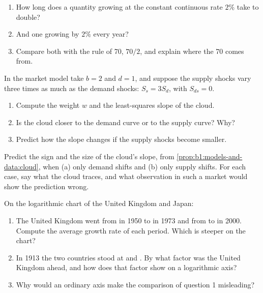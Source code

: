 \begin{exercise}[$\star\star$]\label{exo:b1:models-and-data:doubling}
\begin{enumerate}
  \item How long does a quantity growing at the constant continuous rate $2\%$ take to double?
  \item And one growing by $2\%$ every year?
  \item Compare both with the rule of 70, $70/2$, and explain where the 70 comes from.
\end{enumerate}
\end{exercise}

\begin{exercise}[$\star\star$]\label{exo:b1:models-and-data:slope-numbers}
In the market model take $b = 2$ and $d = 1$, and suppose the supply shocks
vary three times as much as the demand shocks: $S_s = 3S_d$, with $S_{ds} =
0$.
\begin{enumerate}
  \item Compute the weight $w$ and the least-squares slope of the cloud.
  \item Is the cloud closer to the demand curve or to the supply curve? Why?
  \item Predict how the slope changes if the supply shocks become smaller.
\end{enumerate}
\end{exercise}

\begin{exercise}[$\star\star$]\label{exo:b1:models-and-data:one-curve}
Predict the sign and the size of the cloud's slope, from
\cref{prop:b1:models-and-data:cloud}, when (a) only demand shifts and (b)
only supply shifts. For each case, say what the cloud traces, and what
observation in such a market would show the prediction wrong.
\end{exercise}

\begin{exercise}[$\star\star$]\label{exo:b1:models-and-data:log-chart}
On the logarithmic chart of the United Kingdom and Japan:
\begin{enumerate}
  \item The United Kingdom went from  in 1950 to  in 1973 and from  to  in 2000. %
    Compute the average growth rate of each period. Which is steeper on the chart?
  \item In 1913 the two countries stood at  and . %
    By what factor was the United Kingdom ahead, and how does that factor show on a logarithmic axis?
  \item Why would an ordinary axis make the comparison of question 1 misleading?
\end{enumerate}
\end{exercise}

